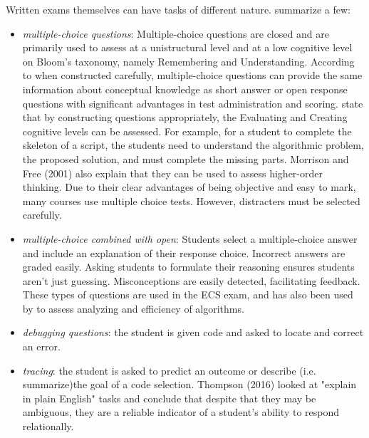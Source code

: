 Written exams themselves can have tasks of different nature.  summarize a few:
\begin{itemize}
\item \emph{multiple-choice questions}: Multiple-choice questions are closed and are primarily used to assess at a unistructural level \cite{Zhong2016} and at a low cognitive level on Bloom's taxonomy, namely Remembering and Understanding\cite{zur-burgury2013israelExam}. According to  when constructed carefully, multiple-choice questions can provide the same information about conceptual knowledge as short answer or open response questions with significant advantages in test administration and scoring. \cite{zur-burgury2013israelExam} state that by constructing questions appropriately, the Evaluating and Creating cognitive levels can be assessed. For example, for a student to complete the skeleton of a script, the students need to understand the algorithmic problem, the proposed solution, and must complete the missing parts. Morrison and Free (2001) also explain that they can be used to assess higher-order thinking. Due to their clear advantages of being objective and easy to mark, many courses use multiple choice tests. However, distracters must be selected carefully.
\item \emph{multiple-choice combined with open}: Students select a multiple-choice answer and include an explanation of their response choice. Incorrect answers are graded easily. Asking students to formulate their reasoning ensures students aren't just guessing. Misconceptions are easily detected, facilitating feedback. These types of questions are used in the ECS exam, and has also been used by \cite{gal2002efficiency} to assess analyzing and efficiency of algorithms.
\item \emph{debugging questions}: the student is given code and asked to locate and correct an error.
\item \emph{tracing}: the student is asked to predict an outcome or describe (i.e. summarize)the goal of a code selection. Thompson (2016) looked at "explain in plain English" tasks and conclude that despite that they may be ambiguous, they are a reliable indicator of a student’s ability to respond relationally.


\end{itemize}
